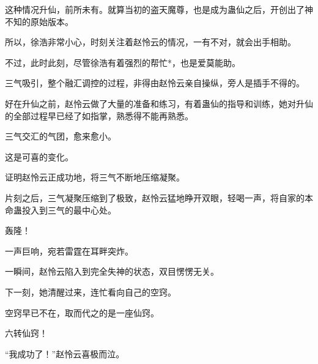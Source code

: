 \begin{this_body}
这种情况升仙，前所未有。就算当初的盗天魔尊，也是成为蛊仙之后，开创出了神不知的原始版本。

所以，徐浩非常小心，时刻关注着赵怜云的情况，一有不对，就会出手相助。

不过，此时此刻，尽管徐浩有着强烈的帮忙*，也是爱莫能助。

三气吸引，整个融汇调控的过程，非得由赵怜云亲自操纵，旁人是插手不得的。

好在升仙之前，赵怜云做了大量的准备和练习，有着蛊仙的指导和训练，她对升仙的全部过程早已经了如指掌，熟悉得不能再熟悉。

三气交汇的气团，愈来愈小。

这是可喜的变化。

证明赵怜云正成功地，将三气不断地压缩凝聚。

片刻之后，三气凝聚压缩到了极致，赵怜云猛地睁开双眼，轻喝一声，将自家的本命蛊投入到三气的最中心处。

轰隆！

一声巨响，宛若雷霆在耳畔突炸。

一瞬间，赵怜云陷入到完全失神的状态，双目愣愣无关。

下一刻，她清醒过来，连忙看向自己的空窍。

空窍早已不在，取而代之的是一座仙窍。

六转仙窍！

“我成功了！”赵怜云喜极而泣。

\end{this_body}

